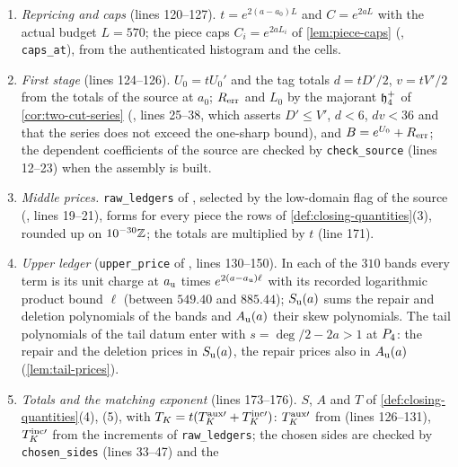 \begin{enumerate}[label=(V\arabic*),leftmargin=*]
\item \emph{Repricing and caps} (lines 120--127). $t=e^{2(a-a_0)L}$ and
 $C=e^{2aL}$ with the actual budget $L=570$; the piece caps
 $C_i=e^{2aL_i}$ of \cref{lem:piece-caps} (,
 \texttt{caps\_at}), from the authenticated histogram and the cells.
\item \emph{First stage} (lines 124--126). $U_0=tU_0'$ and the tag totals
 $d=tD'/2$, $v=tV'/2$ from the totals of the source at $a_0$; $R_{\rm err}$ and
 $L_0$ by the majorant $\mathfrak h_4^+$ of \cref{cor:two-cut-series}
 (, lines
 25--38, which asserts $D'\le V'$, $d<6$, $dv<36$ and that the series does not
 exceed the one-sharp bound), and $B=e^{U_0}+R_{\rm err}$; the dependent
 coefficients of the source are checked by \texttt{check\_source} (lines
 12--23) when the assembly is built.
\item \emph{Middle prices.} \texttt{raw\_ledgers} of
 , selected by the
 low-domain flag of the source
 (, lines 19--21),
 forms for every piece the rows of \cref{def:closing-quantities}(3), rounded up
 on $10^{-30}\mathbb Z$; the totals are multiplied by $t$ (line 171).
\item \emph{Upper ledger} (\texttt{upper\_price} of
 , lines 130--150). In
 each of the $310$ bands every term is its unit charge at $a_{\rm u}$ times
 $e^{2(a-a_{\rm u})\ell}$ with its recorded logarithmic product bound $\ell$
 (between $549.40$ and $885.44$); $S_{\rm u}(a)$ sums the repair and deletion
 polynomials of the bands and $A_{\rm u}(a)$ their skew polynomials. The tail
 polynomials of the tail datum enter with $s=\deg/2-2a>1$ at $P_4$: the
 repair and the deletion prices in $S_{\rm u}(a)$, the repair prices also in
 $A_{\rm u}(a)$ (\cref{lem:tail-prices}).
\item \emph{Totals and the matching exponent} (lines 173--176). $S$, $A$ and $T$
 of \cref{def:closing-quantities}(4), (5), with
 $T_K=t(T^{\rm aux\prime}_K+T^{\rm inc\prime}_K)$: $T^{\rm aux\prime}_K$ from
  (lines 126--131),
 $T^{\rm inc\prime}_K$ from the increments of \texttt{raw\_ledgers}; the
 chosen sides are checked by \texttt{chosen\_sides} (lines 33--47) and the

\end{enumerate}
